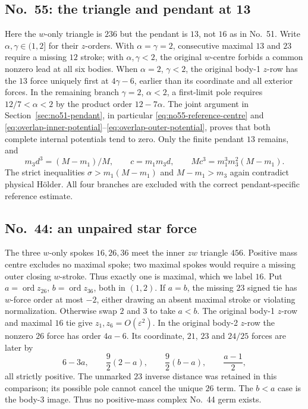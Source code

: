 \documentclass[11pt]{amsart}
\theoremstyle{remark}
\newcommand{\ord}{\operatorname{ord}}
\begin{document}
\subsection{No.~55: the triangle and pendant at 13}\label{sec:no55-pendant}
Here the $w$-only triangle is $236$ but the pendant is $13$, not $16$ as in No.~51. Write $\alpha,\gamma\in(1,2]$ for their $z$-orders. With $\alpha=\gamma=2$, consecutive maximal $13$ and $23$ require a missing $12$ stroke; with $\alpha,\gamma<2$, the original $w$-centre forbids a common nonzero lead at all six bodies. When $\alpha=2$, $\gamma<2$, the original body-1 $z$-row has the $13$ force uniquely first at $4\gamma-6$, earlier than its coordinate and all exterior forces. In the remaining branch $\gamma=2$, $\alpha<2$, a first-limit pole requires $12/7<\alpha<2$ by the product order $12-7\alpha$. The joint argument in Section~\ref{sec:no51-pendant}, in particular \eqref{eq:no55-reference-centre} and \eqref{eq:overlap-inner-potential}--\eqref{eq:overlap-outer-potential}, proves that both complete internal potentials tend to zero. Only the finite pendant $13$ remains, and
\begin{equation}\label{eq:no55-pole}
m_3d^3=(M-m_1)/M,\qquad c=m_1m_3d,\qquad Mc^3=m_1^3m_3^2(M-m_1).
\end{equation}
The strict inequalities $\sigma>m_1(M-m_1)$ and $M-m_1>m_3$ again contradict physical H\"older. All four branches are excluded with the correct pendant-specific reference estimate.

\subsection{No.~44: an unpaired star force}\label{sec:no44-force}
The three $w$-only spokes $16,26,36$ meet the inner $zw$ triangle $456$. Positive mass centre excludes no maximal spoke; two maximal spokes would require a missing outer closing $w$-stroke. Thus exactly one is maximal, which we label $16$. Put $a=\ord z_{26}$, $b=\ord z_{36}$, both in $(1,2)$. If $a=b$, the missing $23$ signed tie has $w$-force order at most $-2$, either drawing an absent maximal stroke or violating normalization. Otherwise swap $2$ and $3$ to take $a<b$. The original body-1 $z$-row and maximal $16$ tie give $z_1,z_6=O(\varepsilon^2)$. In the original body-2 $z$-row the nonzero $26$ force has order $4a-6$. Its coordinate, $21$, $23$ and $24/25$ forces are later by
\begin{equation}\label{eq:no44-order-gaps}
6-3a,\qquad \frac92(2-a),\qquad \frac92(b-a),\qquad \frac{a-1}{2},
\end{equation}
all strictly positive. The unmarked $23$ inverse distance was retained in this comparison; its possible pole cannot cancel the unique $26$ term. The $b<a$ case is the body-3 image. Thus no positive-mass complex No.~44 germ exists.
\end{document}
